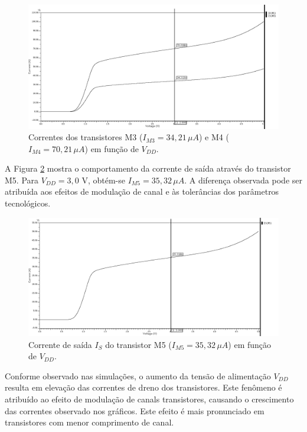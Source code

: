\documentclass[12pt,a4paper]{article}
\begin{document}
\begin{figure}[H]
    \centering
    \includegraphics[width=1\textwidth]{images/corrente_m3_m4.png}
    \caption{Correntes dos transistores M3 ($I_{M3} = 34{,}21\,\mu A$) e M4 ($I_{M4} = 70{,}21\,\mu A$) em função de $V_{DD}$.}
    \label{fig:corrente_m3_m4}
\end{figure}

A Figura \ref{fig:corrente_m5} mostra o comportamento da corrente de saída através do transistor M5. Para $V_{DD} = 3{,}0$ V, obtém-se $I_{M5} = 35{,}32\,\mu A$. A diferença observada pode ser atribuída aos efeitos de modulação de canal e às tolerâncias dos parâmetros tecnológicos.

\begin{figure}[H]
    \centering
    \includegraphics[width=1\textwidth]{images/corrente_m5.png}
    \caption{Corrente de saída $I_S$ do transistor M5 ($I_{M5} = 35{,}32\,\mu A$) em função de $V_{DD}$.}
    \label{fig:corrente_m5}
\end{figure}


Conforme observado nas simulações, o aumento da tensão de alimentação $V_{DD}$ resulta em elevação das correntes de dreno dos transistores. Este fenômeno é atribuído ao efeito de modulação de canals transistores, causando o crescimento das correntes observado nos gráficos. Este efeito é mais pronunciado em transistores com menor comprimento de canal.
\end{document}
